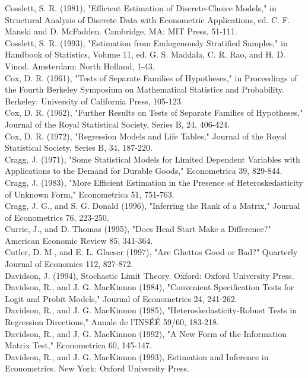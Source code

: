 \documentclass[10pt]{article}
\begin{document}
Cosslett, S. R. (1981), "Efficient Estimation of Discrete-Choice Models," in Structural Analysis of Discrete Data with Econometric Applications, ed. C. F. Manski and D. McFadden. Cambridge, MA: MIT Press, 51-111.\\
Cosslett, S. R. (1993), "Estimation from Endogenously Stratified Samples," in Handbook of Statistics, Volume 11, ed. G. S. Maddala, C. R. Rao, and H. D. Vinod. Amsterdam: North Holland, 1-43.\\
Cox, D. R. (1961), "Tests of Separate Families of Hypotheses," in Proceedings of the Fourth Berkeley Symposium on Mathematical Statistics and Probability. Berkeley: University of California Press, 105-123.\\
Cox, D. R. (1962), "Further Results on Tests of Separate Families of Hypotheses," Journal of the Royal Statistical Society, Series B, 24, 406-424.\\
Cox, D. R. (1972), "Regression Models and Life Tables," Journal of the Royal Statistical Society, Series B, 34, 187-220.\\
Cragg, J. (1971), "Some Statistical Models for Limited Dependent Variables with Applications to the Demand for Durable Goods," Econometrica 39, 829-844.\\
Cragg, J. (1983), "More Efficient Estimation in the Presence of Heteroskedasticity of Unknown Form," Econometrica 51, 751-763.\\
Cragg, J. G., and S. G. Donald (1996), "Inferring the Rank of a Matrix," Journal of Econometrics 76, 223-250.\\
Currie, J., and D. Thomas (1995), "Does Head Start Make a Difference?" American Economic Review 85, 341-364.\\
Cutler, D. M., and E. L. Glaeser (1997), "Are Ghettos Good or Bad?" Quarterly Journal of Economics 112, 827-872.\\
Davidson, J. (1994), Stochastic Limit Theory. Oxford: Oxford University Press.\\
Davidson, R., and J. G. MacKinnon (1984), "Convenient Specification Tests for Logit and Probit Models," Journal of Econometrics 24, 241-262.\\
Davidson, R., and J. G. MacKinnon (1985), "Heteroskedasticity-Robust Tests in Regression Directions," Annale de l'INSÉÉ 59/60, 183-218.\\
Davidson, R., and J. G. MacKinnon (1992), "A New Form of the Information Matrix Test," Econometrica 60, 145-147.\\
Davidson, R., and J. G. MacKinnon (1993), Estimation and Inference in Econometrics. New York: Oxford University Press.\\
\end{document}
